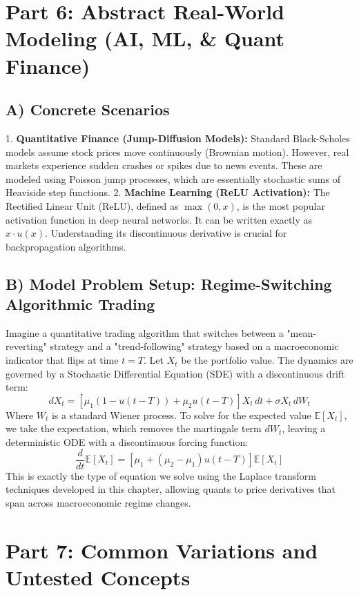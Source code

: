 \documentclass[11pt, letterpaper]{article}
\theoremstyle{definition}
\theoremstyle{remark}
\newcommand{\E}{\mathbb{E}}
\begin{document}
\section{Part 6: Abstract Real-World Modeling (AI, ML, \& Quant Finance)}

\subsection{A) Concrete Scenarios}
1. \textbf{Quantitative Finance (Jump-Diffusion Models):} Standard Black-Scholes models assume stock prices move continuously (Brownian motion). However, real markets experience sudden crashes or spikes due to news events. These are modeled using Poisson jump processes, which are essentially stochastic sums of Heaviside step functions.
2. \textbf{Machine Learning (ReLU Activation):} The Rectified Linear Unit (ReLU), defined as $\max(0, x)$, is the most popular activation function in deep neural networks. It can be written exactly as $x \cdot u(x)$. Understanding its discontinuous derivative is crucial for backpropagation algorithms.

\subsection{B) Model Problem Setup: Regime-Switching Algorithmic Trading}
Imagine a quantitative trading algorithm that switches between a "mean-reverting" strategy and a "trend-following" strategy based on a macroeconomic indicator that flips at time $t=T$. 
Let $X_t$ be the portfolio value. The dynamics are governed by a Stochastic Differential Equation (SDE) with a discontinuous drift term:
\[
dX_t = \left[ \mu_1 (1 - u(t-T)) + \mu_2 u(t-T) \right] X_t \, dt + \sigma X_t \, dW_t
\]
Where $W_t$ is a standard Wiener process. To solve for the expected value $\E[X_t]$, we take the expectation, which removes the martingale term $dW_t$, leaving a deterministic ODE with a discontinuous forcing function:
\[
\frac{d}{dt}\E[X_t] = \left[ \mu_1 + (\mu_2 - \mu_1)u(t-T) \right] \E[X_t]
\]
This is exactly the type of equation we solve using the Laplace transform techniques developed in this chapter, allowing quants to price derivatives that span across macroeconomic regime changes.

\section{Part 7: Common Variations and Untested Concepts}
\end{document}

